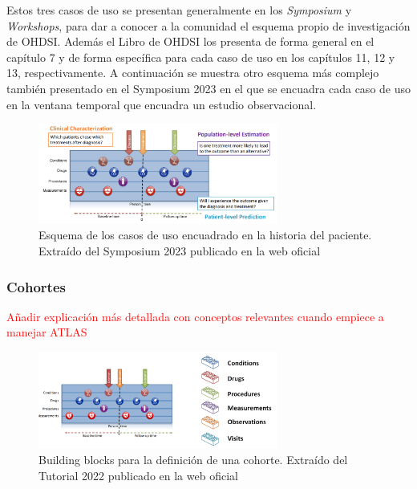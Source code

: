 Estos tres casos de uso se presentan generalmente en los \textit{Symposium} y \textit{Workshops}, para dar a conocer a la comunidad el esquema propio de investigación de OHDSI. Además el Libro de OHDSI \cite{OHDSIbook} los presenta de forma general en el capítulo 7 y de forma específica para cada caso de uso en los capítulos 11, 12 y 13, respectivamente. A continuación se muestra otro esquema más complejo también presentado en el Symposium 2023 en el que se encuadra cada caso de uso en la ventana temporal que encuadra un estudio observacional.


\begin{figure}[H]
\centering
\includegraphics[width=0.70\textwidth]{figures/useCasesJourney.png}
     \caption{Esquema de los casos de uso encuadrado en la historia del paciente. Extraído del Symposium 2023 publicado en la web oficial \cite{OHDSIwebsite}}
    \label{fig:useCasesJourney}
\end{figure}

\subsubsection{Cohortes}

\textcolor{red}{Añadir explicación más detallada con conceptos relevantes cuando empiece a manejar ATLAS}

\begin{figure}[H]
\centering
\includegraphics[width=0.70\textwidth]{figures/bblocksPatientJourney.png}
     \caption{Building blocks para la definición de una cohorte. Extraído del Tutorial 2022 publicado en la web oficial \cite{OHDSIwebsite}}
    \label{fig:bblocksPatientJourney}
\end{figure}


